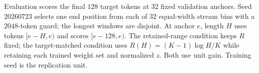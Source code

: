 Evaluation scores the final $128$ target tokens at $32$ fixed validation
anchors. Seed $20260723$ selects one end position from each of $32$
equal-width stream bins with a $2048$-token guard; the longest windows are
disjoint. At anchor $e$, length $H$ uses tokens $[e-H,e)$ and scores
$[e-128,e)$. The retained-range condition keeps $R$ fixed; the target-matched
condition uses $R(H)=(K-1)\log H/K$ while retaining each trained weight set
and normalized $z$. Both use unit gain. Training seed is the replication unit.
\begin{table}[ht]
\caption{Exact-range anchored \evq{} minus the matched geometric control tail-NLL contrasts.
Mean$\pm$SD is across three independent training seeds.}
\label{tab:exact-range-3seed}
\centering
\small
{}
\end{table}


